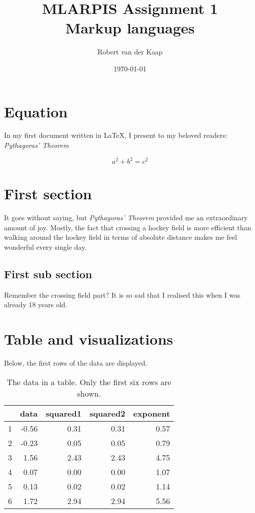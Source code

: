 \documentclass[10pt, a4paper, titlepage]{article} %
\title{MLARPIS Assignment 1\\ \small Markup languages} %
\author{Robert van der Kaap} %
\date{\today} %
\begin{document}
\maketitle %
\newpage %

\section*{Equation}

In my first document written in LaTeX, I present to my beloved readers: \emph{Pythagoras' Theorem}

\[ a^2 + b^2 = c^2  \]

\section*{First section}  %

It goes without saying, but \emph{Pythagoras' Theorem} provided me an extraordinary amount of joy. Mostly, the fact that crossing a hockey field is more efficient than walking around the hockey field in terms of absolute distance makes me feel wonderful every single day.

\subsection{First sub section} %

Remember the crossing field part? It is so sad that I realised this when I was already 18 years old. 

\section{Table and visualizations}

Below, the first rows of the data are displayed.

\begin{table}[ht]
\centering
\caption{The data in a table. Only the first six rows are shown.}
\begin{tabular}{rrrrr}
  \hline
 & data & squared1 & squared2 & exponent \\ 
  \hline
1 & -0.56 & 0.31 & 0.31 & 0.57 \\ 
  2 & -0.23 & 0.05 & 0.05 & 0.79 \\ 
  3 & 1.56 & 2.43 & 2.43 & 4.75 \\ 
  4 & 0.07 & 0.00 & 0.00 & 1.07 \\ 
  5 & 0.13 & 0.02 & 0.02 & 1.14 \\ 
  6 & 1.72 & 2.94 & 2.94 & 5.56 \\ 
   \hline
\end{tabular}
\
\end{table}
\end{document}
